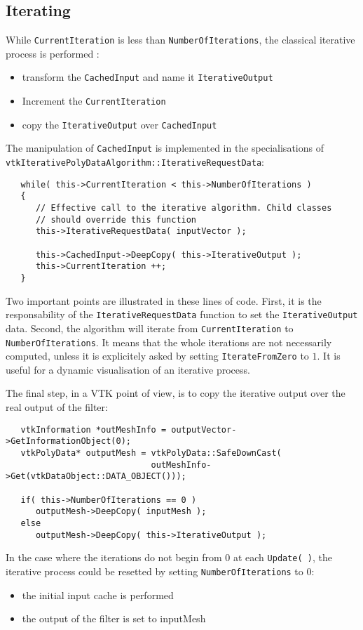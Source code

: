 \documentclass{InsightArticle}
\begin{document}
\subsection{Iterating}
%
While \verb!CurrentIteration! is less than \verb!NumberOfIterations!, the 
classical iterative process is performed :
\begin{itemize}
 \item transform the \verb!CachedInput! and name it \verb!IterativeOutput!
 \item Increment the \verb!CurrentIteration!
 \item copy the \verb!IterativeOutput! over \verb!CachedInput!
\end{itemize}
%
The manipulation of \verb!CachedInput! is implemented in the specialisations of 
\verb!vtkIterativePolyDataAlgorithm::IterativeRequestData!:
%
\begin{verbatim}
   while( this->CurrentIteration < this->NumberOfIterations )
   {
      // Effective call to the iterative algorithm. Child classes
      // should override this function
      this->IterativeRequestData( inputVector ); 

      this->CachedInput->DeepCopy( this->IterativeOutput );
      this->CurrentIteration ++;      
   }     
\end{verbatim}
%
Two important points are illustrated in these lines of code. First, it is the 
responsability of the \verb!IterativeRequestData! function to set the
\verb!IterativeOutput! data. Second, the algorithm will iterate from 
\verb!CurrentIteration! to \verb!NumberOfIterations!. It means that the whole
iterations are not necessarily computed, unless it is explicitely asked by 
setting \verb!IterateFromZero! to $1$. It is useful for a dynamic visualisation
of an iterative process.

The final step, in a VTK point of view, is to copy the iterative output over
the real output of the filter:
%
\begin{verbatim}
   vtkInformation *outMeshInfo = outputVector->GetInformationObject(0);
   vtkPolyData* outputMesh = vtkPolyData::SafeDownCast(
                             outMeshInfo->Get(vtkDataObject::DATA_OBJECT()));

   if( this->NumberOfIterations == 0 )
      outputMesh->DeepCopy( inputMesh );
   else
      outputMesh->DeepCopy( this->IterativeOutput );  
\end{verbatim}
%
In the case where the iterations do not begin from 0 at each \verb!Update( )!, 
the iterative process could be resetted by setting \verb!NumberOfIterations! to
0:
\begin{itemize}
 \item the initial input cache is performed
 \item the output of the filter is set to inputMesh
\end{itemize}
%
\end{document}
